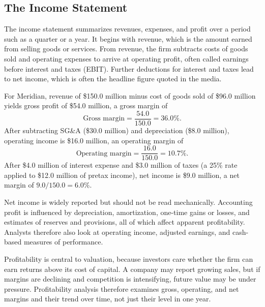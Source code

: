 \documentclass[../ai_in_finance]{subfiles}
\begin{document}
\subsection{The Income Statement}

The income statement summarizes revenues, expenses, and profit over a period such as a quarter or a year. It begins with revenue, which is the amount earned from selling goods or services. From revenue, the firm subtracts costs of goods sold and operating expenses to arrive at operating profit, often called earnings before interest and taxes (EBIT). Further deductions for interest and taxes lead to net income, which is often the headline figure quoted in the media.

For Meridian, revenue of \$150.0 million minus cost of goods sold of \$96.0 million yields gross profit of \$54.0 million, a gross margin of
\begin{equation*}
\text{Gross margin} = \frac{54.0}{150.0} = 36.0\%.
\end{equation*}
After subtracting SG\&A (\$30.0 million) and depreciation (\$8.0 million), operating income is \$16.0 million, an operating margin of
\begin{equation*}
\text{Operating margin} = \frac{16.0}{150.0} = 10.7\%.
\end{equation*}
After \$4.0 million of interest expense and \$3.0 million of taxes (a 25\% rate applied to \$12.0 million of pretax income), net income is \$9.0 million, a net margin of $9.0/150.0 = 6.0\%$.

Net income is widely reported but should not be read mechanically. Accounting profit is influenced by depreciation, amortization, one-time gains or losses, and estimates of reserves and provisions, all of which affect apparent profitability. Analysts therefore also look at operating income, adjusted earnings, and cash-based measures of performance.

Profitability is central to valuation, because investors care whether the firm can earn returns above its cost of capital. A company may report growing sales, but if margins are declining and competition is intensifying, future value may be under pressure. Profitability analysis therefore examines gross, operating, and net margins and their trend over time, not just their level in one year.
\end{document}
